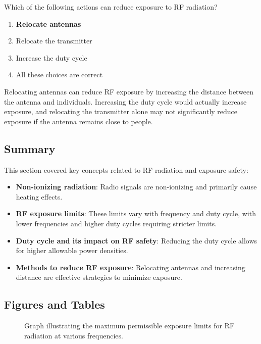 
\begin{tcolorbox}[colback=gray!10!white,colframe=black!75!black,title={T0C08}]
Which of the following actions can reduce exposure to RF radiation?
\begin{enumerate}[label=\Alph*,noitemsep]
    \item \textbf{Relocate antennas}
    \item Relocate the transmitter
    \item Increase the duty cycle
    \item All these choices are correct
\end{enumerate}
\end{tcolorbox}
Relocating antennas can reduce RF exposure by increasing the distance between the antenna and individuals. Increasing the duty cycle would actually increase exposure, and relocating the transmitter alone may not significantly reduce exposure if the antenna remains close to people.


\subsection*{Summary}
This section covered key concepts related to RF radiation and exposure safety:
\begin{itemize}
    \item \textbf{Non-ionizing radiation}: Radio signals are non-ionizing and primarily cause heating effects.
    \item \textbf{RF exposure limits}: These limits vary with frequency and duty cycle, with lower frequencies and higher duty cycles requiring stricter limits.
    \item \textbf{Duty cycle and its impact on RF safety}: Reducing the duty cycle allows for higher allowable power densities.
    \item \textbf{Methods to reduce RF exposure}: Relocating antennas and increasing distance are effective strategies to minimize exposure.
\end{itemize}

\subsection*{Figures and Tables}
\begin{figure}[h!]
    \centering
    \caption{Graph illustrating the maximum permissible exposure limits for RF radiation at various frequencies.}
    \label{fig:rf_exposure_limits}
\end{figure}

